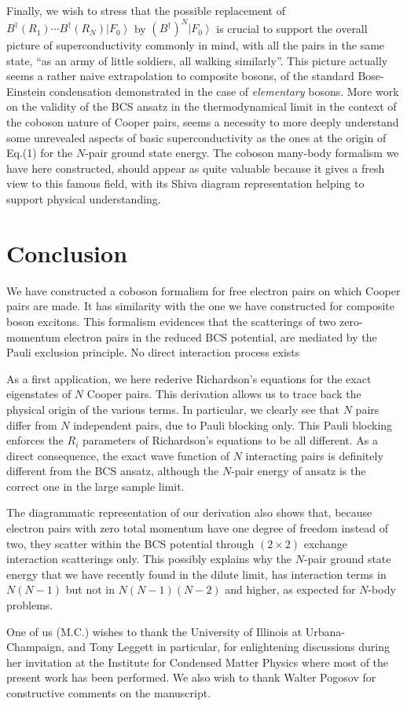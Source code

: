 \documentclass[epj]{svjour}
\begin{document}
Finally, we wish to stress that the possible replacement of $B^{\dagger}(R_1)\cdots{}B^{\dagger}(R_N)%
\left|F_0\right>  $ by $\left(B^{\dagger}\right) ^N\left|F_0\right>  $ is
crucial to support the overall picture of
superconductivity commonly in mind, with all the pairs in the same state, ``as an army of
little soldiers, all walking similarly''.  This picture actually seems a rather naive extrapolation to composite bosons, of the standard Bose-Einstein condensation demonstrated in the case of  \emph{elementary} bosons. 
More work on the validity of the BCS 
ansatz in the thermodynamical limit in the context of the coboson nature of Cooper pairs, seems a necessity to more deeply understand some unrevealed aspects of basic superconductivity as the ones at the origin of Eq.(1) for the $N$-pair ground state energy. The coboson many-body formalism we have here constructed, should appear as quite valuable because it gives a fresh view to this famous field, with its Shiva diagram representation helping to support physical understanding.
 

\section{Conclusion}

We have constructed a coboson formalism for free electron pairs on which Cooper pairs are made. It has similarity with the one we have constructed for composite boson excitons. This formalism evidences that the scatterings of two zero-momentum electron pairs in the reduced BCS potential, are mediated by the Pauli exclusion principle. No direct interaction process exists


As a first application, we here rederive Richardson's equations for the exact eigenstates of $N$ Cooper pairs. This 
  derivation allows us to trace back
the physical origin of the various terms. In
particular, we clearly see that $N$ pairs differ from $N$ independent
pairs, due to Pauli blocking only. This Pauli blocking
enforces the $R_i$ parameters of Richardson's equations to be all different. 
As a direct consequence, the exact wave function of $N$ interacting pairs is 
definitely different from the BCS ansatz, although the $N$-pair energy of ansatz is the correct one in the large sample limit. 

The diagrammatic
representation of our derivation also shows that, because electron pairs
with zero total momentum have one degree of freedom instead of two, they scatter within the BCS potential through 
$(2\times2)$ exchange interaction scatterings only. This possibly explains
why the $N$-pair ground state energy that we have recently found in the dilute limit, has interaction terms in $N(N-1)$ but not in $N(N-1)(N-2)
$ and higher, as expected for $N$-body problems.

One of us (M.C.) wishes to thank the University of Illinois at
Urbana-Champaign, and Tony Leggett in particular, for enlightening discussions during her invitation at
the Institute for Condensed Matter Physics where most of the present work has been
performed. We also wish to thank Walter Pogosov for  constructive comments on the manuscript.




\end{document}
